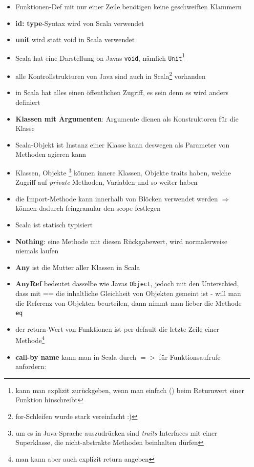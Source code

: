\begin{itemize}
  \item Funktionen-Def mit nur einer Zeile benötigen keine geschweiften Klammern
  \item \textbf{id: type}-Syntax wird von Scala verwendet 
  \item \textbf{unit} wird statt void in Scala verwendet
  \item Scala hat eine Darstellung on Javas \texttt{void}, nämlich 
  \texttt{Unit}\footnote{kann man explizit zurückgeben, wenn man einfach
  () beim Returnwert einer Funktion hinschreibt}
  \item alle Kontrollstrukturen von Java sind auch in 
  Scala\footnote{for-Schleifen wurde stark vereinfacht :)} vorhanden
  \item in Scala hat alles einen öffentlichen Zugriff, es sein denn
  es wird anders definiert
  \item \textbf{Klassen mit Argumenten}: Argumente dienen als
  Konstruktoren für die Klasse
  
    

  \item Scala-Objekt ist Instanz einer Klasse \und kann deswegen als
  Parameter von Methoden agieren kann
  \item Klassen, Objekte \und {}\footnote{um es in Java-Sprache
  auszudrücken sind \textit{traits} Interfaces mit einer Superklasse, die
  nicht-abstrakte Methoden beinhalten dürfen} können innere Klassen, Objekte
  \und traits haben, welche Zugriff auf \textit{private} Methoden,
  Variablen und so weiter haben
  \item die Import-Methode kann innerhalb von Blöcken verwendet werden
  $\Rightarrow$ können dadurch feingranular den scope festlegen
  \item Scala ist statisch typisiert
  \item \textbf{Nothing}: eine Methode mit diesen Rückgabewert, wird
  normalerweise niemals laufen
  \item \textbf{Any} ist die Mutter aller Klassen in Scala
  \item \textbf{AnyRef} bedeutet dasselbe wie Javas \texttt{Object},
  jedoch mit den Unterschied, dass mit == die inhaltliche Gleichheit von 
  Objekten gemeint ist - will man die Referenz von Objekten beurteilen,
  dann nimmt man lieber die Methode \texttt{eq}
  \item der return-Wert von Funktionen ist per default die letzte Zeile einer
  Methode\footnote{man kann aber auch explizit return angeben}
  \item \textbf{call-by name} kann man in Scala durch $=>$ für Funktionsaufrufe 
  anfordern:
  

\end{itemize}
